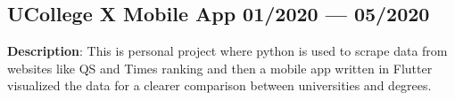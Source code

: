 \subsection{{UCollege X Mobile App
    \hfill 01/2020 --- 05/2020}}
\begin{zitemize}
    \item \textbf{Description}: This is personal project where python is used
        to scrape data from websites like QS and Times ranking and then a mobile
        app written in Flutter visualized the data for a clearer comparison 
        between universities and degrees.
\end{zitemize}
